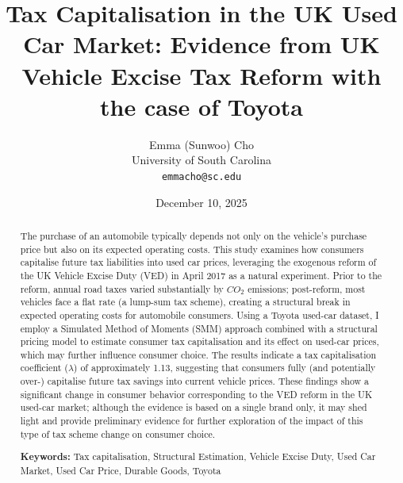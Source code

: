 \documentclass[12pt, a4paper]{article}
\title{\textbf{Tax Capitalisation in the UK Used Car Market: Evidence from UK Vehicle Excise Tax Reform with the case of Toyota}}
\author{Emma (Sunwoo) Cho \\ 
\small University of South Carolina \\
\small \texttt{emmacho@sc.edu}}
\date{December 10, 2025}
\begin{document}
\maketitle

\begin{abstract}
The purchase of an automobile typically depends not only on the vehicle’s purchase price but also on its expected operating costs. This study examines how consumers capitalise future tax liabilities into used car prices, leveraging the exogenous reform of the UK Vehicle Excise Duty (VED) in April 2017 as a natural experiment. Prior to the reform, annual road taxes varied substantially by $CO_{2}$ emissions; post-reform, most vehicles face a flat rate (a lump-sum tax scheme), creating a structural break in expected operating costs for automobile consumers. Using a Toyota used-car dataset, I employ a Simulated Method of Moments (SMM) approach combined with a structural pricing model to estimate consumer tax capitalisation and its effect on used-car prices, which may further influence consumer choice. The results indicate a tax capitalisation coefficient ($\lambda$) of approximately 1.13, suggesting that consumers fully (and potentially over-) capitalise future tax savings into current vehicle prices. These findings show a significant change in consumer behavior corresponding to the VED reform in the UK used-car market; although the evidence is based on a single brand only, it may shed light and provide preliminary evidence for further exploration of the impact of this type of tax scheme change on consumer choice.

\vspace{0.5cm}
\noindent \textbf{Keywords:} Tax capitalisation, Structural Estimation, Vehicle Excise Duty, Used Car Market, Used Car Price, Durable Goods, Toyota
\end{abstract}

\thispagestyle{empty} %
\newpage
\setcounter{page}{1}
\onehalfspacing %
\end{document}
